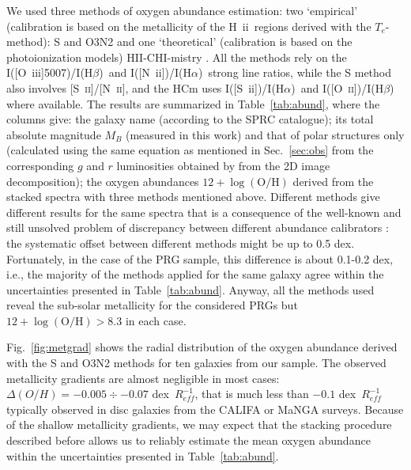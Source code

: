 \documentclass[useAMS,usenatbib]{mnras}
\newcommand{\HII}{H~{\sc ii}\ }
\newcommand{\SIIHa}{I([S~{\sc ii}])/I(H$\alpha$)}
\newcommand{\NIIHa}{I([N~{\sc ii}])/I(H$\alpha$)}
\newcommand{\OIIIHb}{I([O~{\sc iii}]5007)/I(H$\beta$)}
\begin{document}
We used three methods of oxygen abundance estimation: two `empirical' (calibration is based on the  metallicity of the \HII regions derived with the $T_e$-method): S \citep{Pilyugin2016} and O3N2 \citep{Marino2013} and one `theoretical' (calibration is  based on the photoionization models) HII-CHI-mistry \citep[HCm;][]{PerezMontero2014}. All the methods rely on the \OIIIHb\, and \NIIHa\, strong line ratios, while the S method also involves  [S~\textsc{ii}]/[N~\textsc{ii}], and the HCm uses \SIIHa\, and  I([O~\textsc{ii}])/I(H$\beta$)\, where available. 
The results are summarized in Table~\ref{tab:abund}, where the columns give: the galaxy name (according to the SPRC catalogue); its total absolute magnitude $M_B$ (measured in this work) and that of polar structures  only (calculated using the same equation as mentioned in Sec.~\ref{sec:obs} from  the corresponding $g$ and $r$ luminosities  obtained  by \citealt{Reshetnikov2015} from the 2D image  decomposition); the oxygen abundances $\mathrm{12+\log(O/H)}$  derived from the stacked spectra with three  methods mentioned above. 
Different methods give  different results for the same spectra that is a consequence of the well-known and still unsolved problem of discrepancy between different abundance calibrators \cite[see, e.g.,][]{Kewley2008}: the systematic offset between different methods might be up to 0.5 dex. Fortunately, in the case of the PRG sample, this difference is about 0.1-0.2 dex, i.e., the majority of the methods applied for the same galaxy agree within the uncertainties presented in Table~\ref{tab:abund}. Anyway, all the methods used reveal the sub-solar metallicity for the considered PRGs but $12+\log\mathrm{(O/H)}>8.3$ in each case.  
	
Fig.~\ref{fig:metgrad} shows the radial distribution of the oxygen abundance derived with the S and O3N2 methods  for ten galaxies from our sample. The observed metallicity gradients are almost negligible in most cases:  $\Delta(O/H) = -0.005 \div -0.07$ dex~$R_{eff}^{-1}$, that is much less than $ -0.1$ dex~$R_{eff}^{-1}$ typically observed in disc galaxies from the CALIFA \citep{Sanchez2014} or MaNGA \citep{Belfiore2017} surveys. Because of the shallow metallicity gradients, we may expect that the stacking procedure described before allows us to reliably estimate the mean oxygen abundance within the uncertainties  presented in Table~\ref{tab:abund}.  
\end{document}
